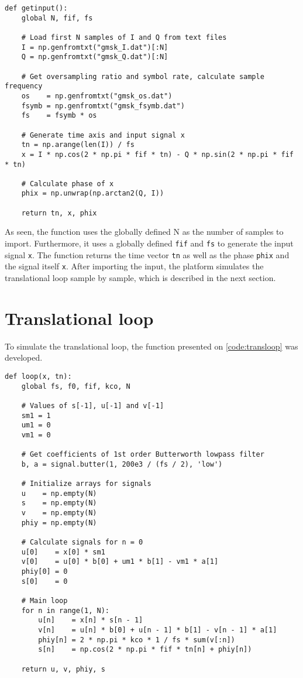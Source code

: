 \lstset{language=python,caption=Function for importing input data,label=code:input}
\begin{lstlisting}
def getinput():
    global N, fif, fs

    # Load first N samples of I and Q from text files
    I = np.genfromtxt("gmsk_I.dat")[:N]
    Q = np.genfromtxt("gmsk_Q.dat")[:N]

    # Get oversampling ratio and symbol rate, calculate sample frequency
    os    = np.genfromtxt("gmsk_os.dat")
    fsymb = np.genfromtxt("gmsk_fsymb.dat")
    fs    = fsymb * os

    # Generate time axis and input signal x
    tn = np.arange(len(I)) / fs
    x = I * np.cos(2 * np.pi * fif * tn) - Q * np.sin(2 * np.pi * fif * tn)

    # Calculate phase of x
    phix = np.unwrap(np.arctan2(Q, I))

    return tn, x, phix
\end{lstlisting}
As seen, the function uses the globally defined N as the number of samples to import. Furthermore, it uses a globally defined \texttt{fif} and \texttt{fs} to generate the input signal \texttt{x}. The function returns the time vector \texttt{tn} as well as the phase \texttt{phix} and the signal itself \texttt{x}. After importing the input, the platform simulates the translational loop sample by sample, which is described in the next section.


\section{Translational loop}
To simulate the translational loop, the function presented on \cref{code:transloop} was developed.\\

\lstset{language=python,caption=Function for simulating tranlational loop,label=code:transloop}
\begin{lstlisting}
def loop(x, tn):
    global fs, f0, fif, kco, N

    # Values of s[-1], u[-1] and v[-1]
    sm1 = 1
    um1 = 0
    vm1 = 0

    # Get coefficients of 1st order Butterworth lowpass filter
    b, a = signal.butter(1, 200e3 / (fs / 2), 'low')

    # Initialize arrays for signals
    u    = np.empty(N)
    s    = np.empty(N)
    v    = np.empty(N)
    phiy = np.empty(N)

    # Calculate signals for n = 0
    u[0]    = x[0] * sm1
    v[0]    = u[0] * b[0] + um1 * b[1] - vm1 * a[1]
    phiy[0] = 0
    s[0]    = 0

    # Main loop
    for n in range(1, N):
        u[n]    = x[n] * s[n - 1]
        v[n]    = u[n] * b[0] + u[n - 1] * b[1] - v[n - 1] * a[1]
        phiy[n] = 2 * np.pi * kco * 1 / fs * sum(v[:n])
        s[n]    = np.cos(2 * np.pi * fif * tn[n] + phiy[n])

    return u, v, phiy, s
\end{lstlisting}

